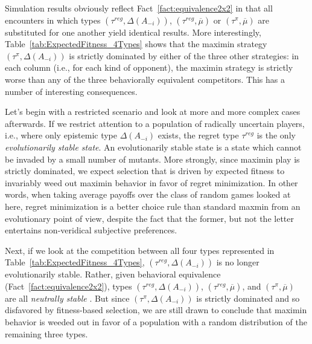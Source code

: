 \documentclass[fleqn,reqno,11pt]{article}
\begin{document}
Simulation results obviously reflect Fact~\ref{fact:equivalence2x2} in that all encounters in
which types $(\tau^{reg}, \Delta(A_{-i}))$, $(\tau^{reg}, \overline{\mu})$ or
$(\tau^{\pi}, \overline{\mu})$ are substituted for one another yield identical results. More
interestingly, Table~\ref{tab:ExpectedFitness_4Types} shows that the maximin strategy
$(\tau^{\pi}, \Delta(A_{-i}))$ is strictly dominated by either of the three other strategies:
in each column (i.e., for each kind of opponent), the maximin strategy is strictly worse
than any of the three behaviorally equivalent competitors. This has a number of interesting
consequences.

Let's begin with a restricted scenario and look at more and more complex cases afterwards. If
we restrict attention to a population of radically uncertain players, i.e., where only
epistemic type $\Delta(A_{-i})$ exists, the regret type $ \tau^{reg} $ is the only
\emph{evolutionarily stable state}. An evolutionarily stable state is a state which cannot be
invaded by a small number of mutants. More strongly, since maximin play is strictly dominated,
we expect selection that is driven by expected fitness to invariably weed out maximin behavior
in favor of regret minimization. In other words, when taking average payoffs over the class of
random games looked at here, regret minimization is a better choice rule than standard maxmin
from an evolutionary point of view, despite the fact that the former, but not the letter
entertains non-veridical subjective preferences.

Next, if we look at the competition between all four types represented in
Table~\ref{tab:ExpectedFitness_4Types}, $(\tau^{reg}, \Delta(A_{-i}))$ is no longer
evolutionarily stable. Rather, given behavioral equivalence (Fact~\ref{fact:equivalence2x2}),
types $(\tau^{reg}, \Delta(A_{-i}))$, $(\tau^{reg}, \overline{\mu})$, and
$(\tau^{\pi}, \overline{\mu})$ are all \emph{neutrally stable}
\citep{Maynard-Smith1982:Evolution-and-t}. But since $(\tau^{\pi}, \Delta(A_{-i}))$ is strictly
dominated and so disfavored by fitness-based selection, we are still drawn to conclude that
maximin behavior is weeded out in favor of a population with a random distribution of the
remaining three types.
\end{document}
